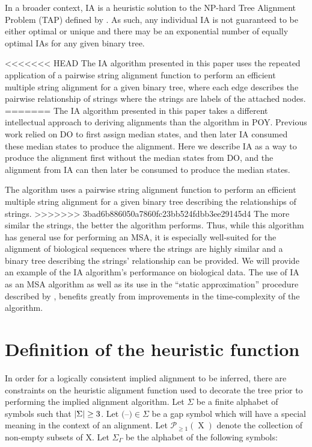 \documentclass[11pt]{article}
\newcommand*\NEPowerset{\mathcal{P}_{\geq 1}}
\newcommand*\gap{\textrm{(--)}}
\DeclarePairedDelimiter\setsize{\lvert}{\rvert}%
\begin{document}
In a broader context, IA is a heuristic solution to the NP-hard Tree Alignment Problem (TAP) defined by \cite{sankoff1975}.
As such, any individual IA is not guaranteed to be either optimal or unique and there may be an exponential number of equally optimal IAs for any given binary tree.

<<<<<<< HEAD
The IA algorithm presented in this paper uses the repeated application of a pairwise string alignment function to perform an efficient multiple string alignment for a given binary tree, where each edge describes the pairwise relationship of strings where the strings are labels of the attached nodes.
=======
The IA algorithm presented in this paper takes a different intellectual approach to deriving alignments than the algorithm in POY.
Previous work relied on DO to first assign median states, and then later IA consumed these median states to produce the alignment.
Here we describe IA as a way to produce the alignment first without the median states from DO, and the alignment from IA can then later be consumed to produce the median states.

The algorithm uses a pairwise string alignment function to perform an efficient multiple string alignment for a given binary tree describing the relationships of strings.
>>>>>>> 3bad6b886050a7860fc23bb524fdbb3ee29145d4
The more similar the strings, the better the algorithm performs.
Thus, while this algorithm has general use for performing an MSA, it is especially well-suited for the alignment of biological sequences where the strings are highly similar and a binary tree describing the strings' relationship can be provided. 
We will provide an example of the IA algorithm's performance on biological data.
The use of IA as an MSA algorithm as well as its use in the ``static approximation'' procedure described by \cite{Wheeler2003b}, benefits greatly from improvements in the time-complexity of the algorithm.

\section{Definition of the heuristic function}
In order for a logically consistent implied alignment to be inferred, there are constraints on the heuristic alignment function used to decorate the tree prior to performing the implied alignment algorithm.
Let $\Sigma$ be a finite alphabet of symbols such that $\setsize{\Sigma} \geq 3$.
Let $\gap \in \Sigma$ be a gap symbol which will have a special meaning in the context of an alignment.
Let $\NEPowerset (\operatorname{X})$ denote the collection of non-empty subsets of $\mathrm{X}$.
Let $\Sigma_{\Gamma}$ be the alphabet of the following symbols:
\end{document}
